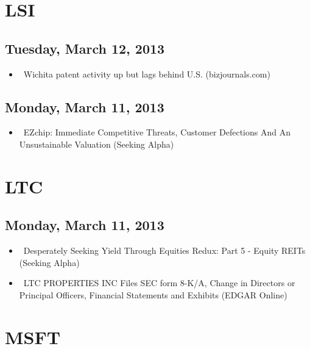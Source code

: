 \documentclass[11pt,asymmetric]{article}
\begin{document}
\section*{LSI}

\subsection*{Tuesday, March 12, 2013}
\begin{itemize}
\item\ Wichita patent activity up but lags behind U.S. (bizjournals.com)
\end{itemize}
\subsection*{Monday, March 11, 2013}
\begin{itemize}
\item\ EZchip: Immediate Competitive Threats, Customer Defections And An Unsustainable Valuation (Seeking Alpha)
\end{itemize}

\section*{LTC}

\subsection*{Monday, March 11, 2013}
\begin{itemize}
\item\ Desperately Seeking Yield Through Equities Redux: Part 5 - Equity REITs (Seeking Alpha)
\item\ LTC PROPERTIES INC Files SEC form 8-K/A, Change in Directors or Principal Officers, Financial Statements and Exhibits (EDGAR Online)
\end{itemize}

\section*{MSFT}
\end{document}
